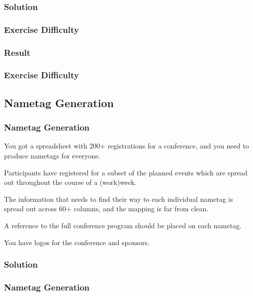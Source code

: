 {\begin{frame}[fragile]
\end{frame}

\subsubsection{Solution}
\begin{frame}[fragile]
  \frametitle{Exercise Difficulty }
  \vspace{3mm}
  
\end{frame}

\subsubsection{Result}
\begin{frame}[fragile]
  \frametitle{Exercise Difficulty }
  \vspace{3mm}
  
\end{frame}

\subsection{Nametag Generation}
\begin{frame}[fragile]
  \frametitle{Nametag Generation}
  \vspace{3mm}
  You got a spreadsheet with 200+ registrations for a conference, and you need to produce nametags for everyone.
  
  \vspace{5mm}
  Participants have registered for a subset of the planned events which are spread out throughout the course of a (work)week.
  
  \vspace{5mm}
  The information that needs to find their way to each individual nametag is spread out across 60+ columns, and the mapping is far from clean.
  
  \vspace{5mm}
  A reference to the full conference program should be placed on each nametag.
  
  \vspace{5mm}
  You have logos for the conference and sponsors.
\end{frame}

\subsubsection{Solution}
\begin{frame}[fragile]
  \frametitle{Nametag Generation }
  \vspace{3mm}
  

\end{frame}}
